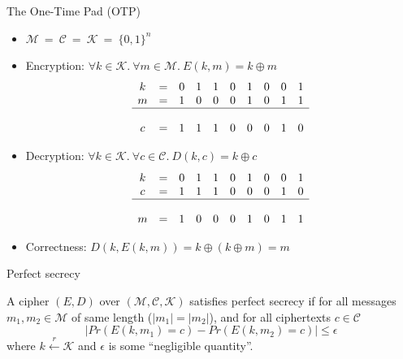 \documentclass[aspectratio=169, lualatex, handout, 10pt,dvipsnames,svgnames]{beamer} %
\newcommand{\Ccal}{\mathcal{C}}
\newcommand{\Kcal}{\mathcal{K}}
\newcommand{\Mcal}{\mathcal{M}}
\begin{document}
\begin{frame}{The One-Time Pad (OTP)}
  \pause
  \vspace{-0.5cm}
  \begin{itemize}

  \item $\Mcal\ =\ \Ccal\ =\ \Kcal\ =\ \{0, 1\}^n$
    \medskip{}
    \pause

  \item Encryption: $\forall k\in\Kcal.\ \forall m\in\Mcal.\ E(k, m) = k \oplus m$
    \pause
    \color{vert}
    \[
    \begin{array}[t]{ccccccccccccccccccccc}
      k & = & 0 & 1 & 1 & 0 & 1 & 0 & 0 & 1 \\
      m & = & 1 & 0 & 0 & 0 & 1 & 0 & 1 & 1 \\
      \hline \\
      c & = & 1 & 1 & 1 & 0 & 0 & 0 & 1 & 0
    \end{array}
    \]
    \color{black}
    \pause

  \item Decryption: $\forall k\in\Kcal.\ \forall c\in\Ccal.\ D(k, c) = k \oplus c$
    \pause
    \color{vert}
    \[
    \begin{array}[t]{ccccccccccccccccccccc}
      k & = & 0 & 1 & 1 & 0 & 1 & 0 & 0 & 1 \\
      c & = & 1 & 1 & 1 & 0 & 0 & 0 & 1 & 0 \\
      \hline \\
      m & = & 1 & 0 & 0 & 0 & 1 & 0 & 1 & 1
    \end{array}
    \]
    \color{black}
    \pause

  \item Correctness: $D(k, E(k, m)) = k \oplus (k\oplus m) = m$
  \end{itemize}
\end{frame}

\begin{frame}{Perfect secrecy}
  

  \begin{definition}
    A cipher $(E, D)$ over $(\Mcal, \Ccal, \Kcal)$ satisfies perfect secrecy if for all messages $m_1, m_2\in\Mcal$ of same length ($|m_1|=|m_2|$), and for all ciphertexts $c\in\Ccal$
    \[
    \left| Pr(E(k, m_1) = c) - Pr(E(k, m_2) = c)
    \right| \le \epsilon
    \]
    where $k \xleftarrow[]{r} \Kcal$ and $\epsilon$ is some ``negligible quantity''.
  \end{definition}

\end{frame}
\end{document}
